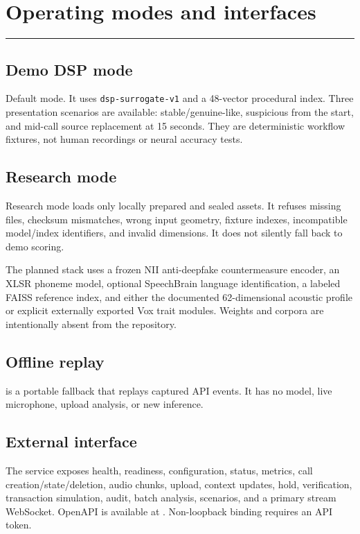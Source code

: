 \documentclass[10pt,a4paper]{article}
\newcommand{\sectionrule}{\vspace{-2mm}\textcolor{blue}{\rule{22mm}{1.2pt}}\vspace{2mm}}
\newcommand{\code}[1]{\texttt{\small #1}}
\begin{document}
\section{Operating modes and interfaces}
\sectionrule

\subsection{Demo DSP mode}

Default mode. It uses \code{dsp-surrogate-v1} and a 48-vector procedural index. Three presentation scenarios are available: stable/genuine-like, suspicious from the start, and mid-call source replacement at 15 seconds. They are deterministic workflow fixtures, not human recordings or neural accuracy tests.

\subsection{Research mode}

Research mode loads only locally prepared and sealed assets. It refuses missing files, checksum mismatches, wrong input geometry, fixture indexes, incompatible model/index identifiers, and invalid dimensions. It does not silently fall back to demo scoring.

The planned stack uses a frozen NII anti-deepfake countermeasure encoder, an XLSR phoneme model, optional SpeechBrain language identification, a labeled FAISS reference index, and either the documented 62-dimensional acoustic profile or explicit externally exported Vox trait modules. Weights and corpora are intentionally absent from the repository.

\subsection{Offline replay}

 is a portable fallback that replays captured API events. It has no model, live microphone, upload analysis, or new inference.

\subsection{External interface}

The service exposes health, readiness, configuration, status, metrics, call creation/state/deletion, audio chunks, upload, context updates, hold, verification, transaction simulation, audit, batch analysis, scenarios, and a primary stream WebSocket. OpenAPI is available at . Non-loopback binding requires an API token.
\end{document}
